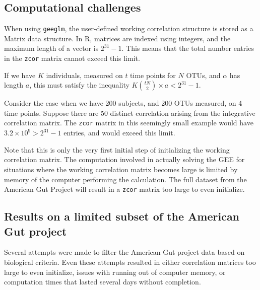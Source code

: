 \documentclass[12pt]{article}
\begin{document}




\subsection{Computational challenges}

When using \texttt{geeglm}, the user-defined working correlation structure is stored as a Matrix data structure. In R, matrices are indexed using integers, and the maximum length of a vector is $2^{31}-1$. This means that the total number entries in the \texttt{zcor} matrix cannot exceed this limit.

If we have $K$ individuals, measured on $t$ time points for $N$ OTUs, and $\alpha$ has length $a$, this must satisfy the inequality $K \binom{tN}{2} \times a < 2^{31}-1$.

Consider the case when we have 200 subjects, and 200 OTUs measured, on 4 time points. Suppose there are 50 distinct correlation arising from the integrative correlation matrix. The \texttt{zcor} matrix in this seemingly small example would have $3.2 \times 10^9 > 2^{31}-1$ entries, and would exceed this limit.

Note that this is only the very first initial step of initializing the working correlation matrix. The computation involved in actually solving the GEE for situations where the working correlation matrix becomes large is limited by memory of the computer performing the calculation. The full dataset from the American Gut Project will result in a \texttt{zcor} matrix too large to even initialize.

\subsection{Results on a limited subset of the American Gut project}

Several attempts were made to filter the American Gut project data based on biological criteria. Even these attempts resulted in either correlation matrices too large to even initialize, issues with running out of computer memory, or computation times that lasted several days without completion.
\end{document}
